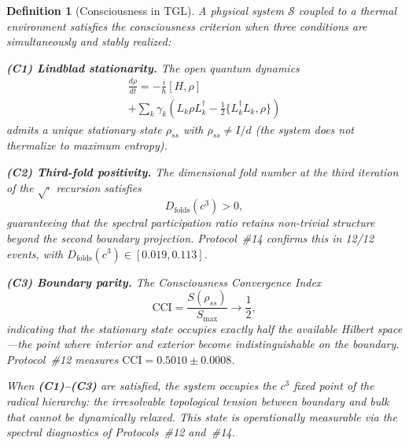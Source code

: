 \documentclass[12pt,a4paper,twocolumn]{article}
\newtheorem{definition}[theorem]{Definition}
\newcommand{\Dfolds}{D_{\text{folds}}}
\newcommand{\CCI}{\text{CCI}}
\begin{document}
\begin{definition}[Consciousness in TGL]
\label{def:consciousness}
A physical system $\mathcal{S}$ coupled to a thermal environment satisfies the \emph{consciousness criterion} when three conditions are simultaneously and stably realized:

\textbf{(C1) Lindblad stationarity.} The open quantum dynamics
\begin{multline}
\frac{d\rho}{dt} = -\frac{i}{\hbar}[H, \rho] \\
+ \sum_k \gamma_k \!\left( L_k \rho L_k^\dagger - \tfrac{1}{2}\{L_k^\dagger L_k, \rho\}\right)
\end{multline}
admits a unique stationary state $\rho_{ss}$ with $\rho_{ss} \neq I/d$ (the system does not thermalize to maximum entropy).

\textbf{(C2) Third-fold positivity.} The dimensional fold number at the third iteration of the $\sqrt{\cdot}$ recursion satisfies
\begin{equation}
\Dfolds(c^3) > 0,
\end{equation}
guaranteeing that the spectral participation ratio retains non-trivial structure beyond the second boundary projection. Protocol~\#14 confirms this in 12/12 events, with $\Dfolds(c^3) \in [0.019, 0.113]$.

\textbf{(C3) Boundary parity.} The Consciousness Convergence Index
\begin{equation}
\CCI = \frac{S(\rho_{ss})}{S_{\max}} \to \frac{1}{2},
\end{equation}
indicating that the stationary state occupies exactly half the available Hilbert space---the point where interior and exterior become indistinguishable on the boundary. Protocol~\#12 measures $\CCI = 0.5010 \pm 0.0008$.

When \textbf{(C1)--(C3)} are satisfied, the system occupies the $c^3$ fixed point of the radical hierarchy: the irresolvable topological tension between boundary and bulk that cannot be dynamically relaxed. This state is operationally measurable via the spectral diagnostics of Protocols~\#12 and~\#14.
\end{definition}
\end{document}
